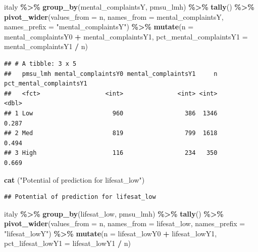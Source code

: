 \documentclass[
]{article}
\newenvironment{Shaded}{\begin{snugshade}}{\end{snugshade}}
\newcommand{\AttributeTok}[1]{\textcolor[rgb]{0.13,0.29,0.53}{#1}}
\newcommand{\FunctionTok}[1]{\textcolor[rgb]{0.13,0.29,0.53}{\textbf{#1}}}
\newcommand{\NormalTok}[1]{#1}
\newcommand{\SpecialCharTok}[1]{\textcolor[rgb]{0.81,0.36,0.00}{\textbf{#1}}}
\newcommand{\StringTok}[1]{\textcolor[rgb]{0.31,0.60,0.02}{#1}}
\begin{document}
\begin{Shaded}
\begin{Highlighting}[]
\NormalTok{italy }\SpecialCharTok{\%\textgreater{}\%}
  \FunctionTok{group\_by}\NormalTok{(mental\_complaintsY, pmsu\_lmh) }\SpecialCharTok{\%\textgreater{}\%}
  \FunctionTok{tally}\NormalTok{() }\SpecialCharTok{\%\textgreater{}\%}
  \FunctionTok{pivot\_wider}\NormalTok{(}\AttributeTok{values\_from =}\NormalTok{ n,}
              \AttributeTok{names\_from =}\NormalTok{ mental\_complaintsY,}
              \AttributeTok{names\_prefix =} \StringTok{"mental\_complaintsY"}\NormalTok{) }\SpecialCharTok{\%\textgreater{}\%}
  \FunctionTok{mutate}\NormalTok{(}\AttributeTok{n =}\NormalTok{ mental\_complaintsY0 }\SpecialCharTok{+}\NormalTok{ mental\_complaintsY1,}
         \AttributeTok{pct\_mental\_complaintsY1 =}\NormalTok{ mental\_complaintsY1 }\SpecialCharTok{/}\NormalTok{ n)}
\end{Highlighting}
\end{Shaded}

\begin{verbatim}
## # A tibble: 3 x 5
##   pmsu_lmh mental_complaintsY0 mental_complaintsY1     n pct_mental_complaintsY1
##   <fct>                  <int>               <int> <int>                   <dbl>
## 1 Low                      960                 386  1346                   0.287
## 2 Med                      819                 799  1618                   0.494
## 3 High                     116                 234   350                   0.669
\end{verbatim}

\begin{Shaded}
\begin{Highlighting}[]
\FunctionTok{cat}\NormalTok{ (}\StringTok{"Potential of prediction for lifesat\_low"}\NormalTok{)}
\end{Highlighting}
\end{Shaded}

\begin{verbatim}
## Potential of prediction for lifesat_low
\end{verbatim}

\begin{Shaded}
\begin{Highlighting}[]
\NormalTok{italy }\SpecialCharTok{\%\textgreater{}\%}
  \FunctionTok{group\_by}\NormalTok{(lifesat\_low, pmsu\_lmh) }\SpecialCharTok{\%\textgreater{}\%}
  \FunctionTok{tally}\NormalTok{() }\SpecialCharTok{\%\textgreater{}\%}
  \FunctionTok{pivot\_wider}\NormalTok{(}\AttributeTok{values\_from =}\NormalTok{ n,}
              \AttributeTok{names\_from =}\NormalTok{ lifesat\_low,}
              \AttributeTok{names\_prefix =} \StringTok{"lifesat\_lowY"}\NormalTok{) }\SpecialCharTok{\%\textgreater{}\%}
  \FunctionTok{mutate}\NormalTok{(}\AttributeTok{n =}\NormalTok{ lifesat\_lowY0 }\SpecialCharTok{+}\NormalTok{ lifesat\_lowY1,}
         \AttributeTok{pct\_lifesat\_lowY1 =}\NormalTok{ lifesat\_lowY1 }\SpecialCharTok{/}\NormalTok{ n)}
\end{Highlighting}
\end{Shaded}
\end{document}
